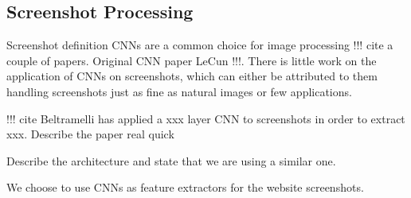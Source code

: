 \subsection{Screenshot Processing}

Screenshot definition
CNNs are a common choice for image processing !!! cite a couple of papers. Original CNN paper LeCun !!!. There is little work on the application of CNNs on screenshots, which can either be attributed to them handling screenshots just as fine as natural images or few applications.

!!! cite Beltramelli has applied a xxx layer CNN to screenshots in order to extract xxx. Describe the paper real quick

Describe the architecture and state that we are using a similar one.

We choose to use CNNs as feature extractors for the website screenshots.
